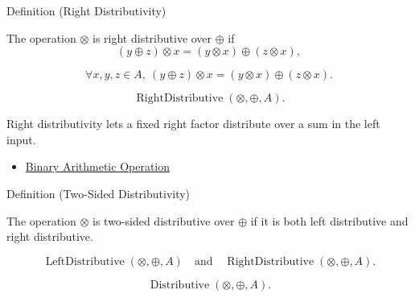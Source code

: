 \begin{definitionbox}{Definition (Right Distributivity)}
\begin{definition}
\label{def:right-distributivity}
The operation $\otimes$ is right distributive over $\oplus$ if
\[
(y\oplus z)\otimes x=(y\otimes x)\oplus(z\otimes x),
\]
\end{definition}
\end{definitionbox}

\begin{remark*}
\[
\forall x,y,z\in A,\ (y\oplus z)\otimes x=(y\otimes x)\oplus(z\otimes x).
\]
\end{remark*}

\begin{remark*}
\[
\operatorname{RightDistributive}(\otimes,\oplus,A).
\]
\end{remark*}

\begin{remark*}[Interpretation]
Right distributivity lets a fixed right factor distribute over a sum in the
left input.
\end{remark*}

\begin{dependencies}
\begin{itemize}
  \item \hyperref[def:binary-arithmetic-operation]{Binary Arithmetic Operation}
\end{itemize}
\end{dependencies}

\begin{definitionbox}{Definition (Two-Sided Distributivity)}
\begin{definition}
\label{def:two-sided-distributivity}
The operation $\otimes$ is two-sided distributive over $\oplus$ if it is both
left distributive and right distributive.
\end{definition}
\end{definitionbox}

\begin{remark*}
\[
\operatorname{LeftDistributive}(\otimes,\oplus,A)
\quad\text{and}\quad
\operatorname{RightDistributive}(\otimes,\oplus,A).
\]
\end{remark*}

\begin{remark*}
\[
\operatorname{Distributive}(\otimes,\oplus,A).
\]
\end{remark*}

